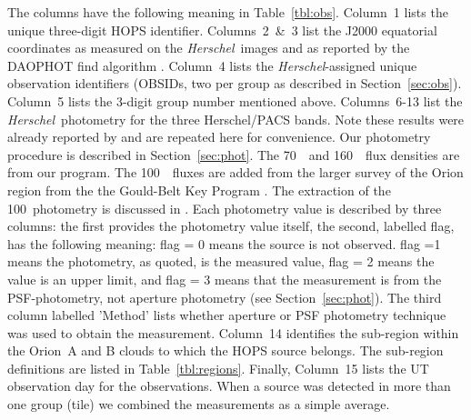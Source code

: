 \documentclass[manuscript]{aastex61}
\newcommand{\herschel}{{\em Herschel}}
\begin{document}
The columns have the following meaning in Table~\ref{tbl:obs}.  Column~1 lists the unique three-digit HOPS identifier.  Columns~2~\&~3 list the J2000 equatorial coordinates as measured on the \herschel\ images and as reported by the DAOPHOT find algorithm \citep{psfphotometry}.  Column~4 lists the \herschel-assigned unique observation identifiers (OBSIDs, two per group as described in Section~\ref{sec:obs}).  Column~5 lists the 3-digit group number mentioned above.  Columns~6-13 list the \herschel\ photometry for the three Herschel/PACS bands.  Note these results were already reported by \cite{furlan} and are repeated here for convenience.  Our photometry procedure is described in Section~\ref{sec:phot}.  The 70~\micron\ and 160~\micron\ flux densities are from our program.  The 100~\micron\ fluxes are added from the larger survey of the Orion region from the the Gould-Belt Key Program \citep{gb}.  The extraction of the 100\micron\ photometry is discussed in \cite{pbrpaper}.  Each photometry value is described by three columns: the first provides the photometry value itself, the second, labelled flag, has the following meaning:   flag = 0 means the source is not observed. flag =1 means the photometry, as quoted, is the measured value,  flag = 2 means the value is an upper limit, and flag = 3 means that the measurement is from the PSF-photometry, not aperture photometry (see Section~\ref{sec:phot}).  The third column labelled 'Method' lists whether aperture or PSF photometry technique was used to obtain the measurement.  Column~14 identifies the sub-region within the Orion~A and B clouds to which the HOPS source belongs.  The sub-region definitions are listed in Table~\ref{tbl:regions}.  Finally, Column~15 lists the UT observation day for the observations.  When a source was detected in more than one group (tile) we combined the measurements as a simple average.
\end{document}
